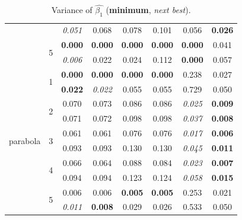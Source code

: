 \documentclass[authoryear, review, 11pt]{elsarticle}
\begin{document}
\begin{table}
\begin{center}
\begin{tabular}{cccccccc}
   &  & \emph{0.051} & 0.068 & 0.078 & 0.101 & 0.056 & \textbf{0.026} \\ 
   \cline{3-8}
   & \multirow{2}{*}{5} & \textbf{0.000} & \textbf{0.000} & \textbf{0.000} & \textbf{0.000} & \textbf{0.000} & 0.041 \\ 
   &  & \emph{0.006} & 0.022 & 0.024 & 0.112 & \textbf{0.000} & 0.057 \\ 
   \hline
  \multirow{10}{*}{parabola} & \multirow{2}{*}{1} & \textbf{0.000} & \textbf{0.000} & \textbf{0.000} & \textbf{0.000} & 0.238 & 0.027 \\ 
   &  & \textbf{0.022} & \emph{0.022} & 0.055 & 0.055 & 0.729 & 0.050 \\ 
   \cline{3-8}
   & \multirow{2}{*}{2} & 0.070 & 0.073 & 0.086 & 0.086 & \emph{0.025} & \textbf{0.009} \\ 
   &  & 0.071 & 0.072 & 0.098 & 0.098 & \emph{0.037} & \textbf{0.008} \\ 
   \cline{3-8}
   & \multirow{2}{*}{3} & 0.061 & 0.061 & 0.076 & 0.076 & \emph{0.017} & \textbf{0.006} \\ 
   &  & 0.093 & 0.093 & 0.130 & 0.130 & \emph{0.045} & \textbf{0.011} \\ 
   \cline{3-8}
   & \multirow{2}{*}{4} & 0.066 & 0.064 & 0.088 & 0.084 & \emph{0.023} & \textbf{0.007} \\ 
   &  & 0.094 & 0.094 & 0.123 & 0.124 & \emph{0.058} & \textbf{0.015} \\ 
   \cline{3-8}
   & \multirow{2}{*}{5} & 0.006 & 0.006 & \textbf{0.005} & \textbf{0.005} & 0.253 & 0.021 \\ 
   &  & \emph{0.011} & \textbf{0.008} & 0.029 & 0.026 & 0.533 & 0.050 \\ 
  \end{tabular}
\caption{Variance of $\hat{\beta_1}$ (\textbf{minimum}, \emph{next best}).\label{table:X1-var}}
\end{center}
\end{table}
\end{document}

